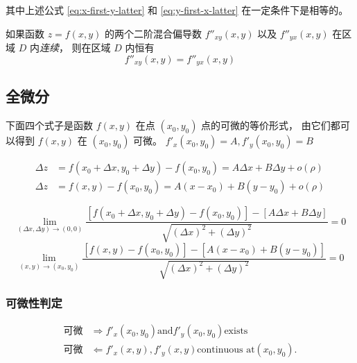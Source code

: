 其中上述公式 \ref{eq:x-first-y-latter} 和 \ref{eq:y-first-x-latter} 在一定条件下是相等的。

\begin{theorem}
    如果函数 $z = f(x, y)$ 的两个二阶混合偏导数 $f''_{xy}(x, y)$ 以及 $f''_{yx}(x, y)$
    在区域 $D$ 内\emph{连续}， 则在区域 $D$ 内恒有
    \[
        f''_{xy}(x, y) = 
        f''_{yx}(x, y)
    \]
\end{theorem}

\subsection{全微分}
下面四个式子是函数 $f(x, y)$ 在点 $(x_0, y_0)$ 点的可微的等价形式，
由它们都可以得到 $f(x, y)$ 在 $(x_0, y_0)$ 可微。
$f'_x(x_0, y_0) = A, f'_y(x_0, y_0) = B$ 

\begin{strip}
    \begin{align}
        \Delta z &= f(x_0 + \Delta x, y_0 + \Delta y) - f(x_0, y_0) = A \Delta x + B \Delta y + o(\rho)\\
        \Delta z &= f(x, y) - f(x_0, y_0) = A (x - x_0) + B (y - y_0) + o(\rho)
    \end{align}

    \begin{equation}
        \label{eq:full-differentiation-determinant-1}
        \lim_{(\Delta x,\Delta y) \to (0,0) }
        \dfrac{\left[ f(x_0 + \Delta x, y_0 + \Delta y) - f(x_0, y_0) \right]-\left[ A\Delta x + B \Delta y \right]}{\sqrt{\left( \Delta x \right)^2 + \left( \Delta y \right)^2}} = 0
    \end{equation}
    \begin{equation}
        \label{eq:full-differentiation-determinant-2}
        \lim_{(x,y) \to (x_0,y_0) }
        \dfrac{\left[ f(x,y) - f(x_0, y_0) \right]-\left[ A(x - x_0) + B(y - y_0) \right]}{\sqrt{\left( \Delta x \right)^2 + \left( \Delta y \right)^2}} = 0
    \end{equation}
\end{strip}

\subsubsection{可微性判定}

\begin{align*}
    \mbox{可微} &\Rightarrow f'_x(x_0, y_0) \mbox{and} f'_y(x_0, y_0) \mbox{exists} \\ 
    \mbox{可微} &\Leftarrow  f'_x(x, y), f'_y(x, y) \mbox{continuous at} (x_0, y_0).
\end{align*}

